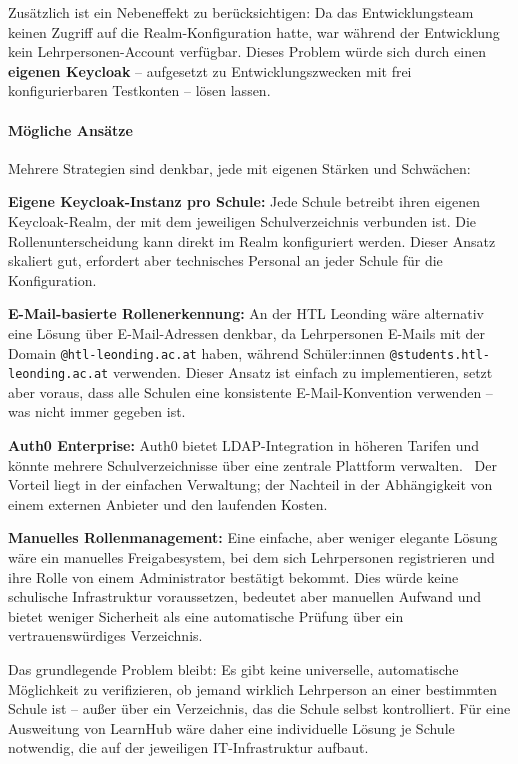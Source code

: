 Zusätzlich ist ein Nebeneffekt zu berücksichtigen: Da das
Entwicklungsteam keinen Zugriff auf die Realm-Konfiguration hatte, war
während der Entwicklung kein Lehrpersonen-Account verfügbar. Dieses
Problem würde sich durch einen \textbf{eigenen Keycloak} -- aufgesetzt
zu Entwicklungszwecken mit frei konfigurierbaren Testkonten -- lösen
lassen.

\paragraph{Mögliche Ansätze}

Mehrere Strategien sind denkbar, jede mit eigenen Stärken und
Schwächen:

\textbf{Eigene Keycloak-Instanz pro Schule:} Jede Schule betreibt
ihren eigenen Keycloak-Realm, der mit dem jeweiligen
Schulverzeichnis verbunden ist. Die Rollenunterscheidung kann direkt
im Realm konfiguriert werden. Dieser Ansatz skaliert gut, erfordert
aber technisches Personal an jeder Schule für die
Konfiguration.~\cite{keycloak-docs}

\textbf{E-Mail-basierte Rollenerkennung:} An der HTL Leonding wäre
alternativ eine Lösung über E-Mail-Adressen denkbar, da Lehrpersonen
E-Mails mit der Domain \texttt{@htl-leonding.ac.at} haben, während
Schüler:innen \texttt{@students.htl-leonding.ac.at} verwenden. Dieser
Ansatz ist einfach zu implementieren, setzt aber voraus, dass alle
Schulen eine konsistente E-Mail-Konvention verwenden -- was nicht
immer gegeben ist.

\textbf{Auth0 Enterprise:} Auth0 bietet LDAP-Integration in höheren
Tarifen und könnte mehrere Schulverzeichnisse über eine zentrale
Plattform verwalten.~\cite{auth0-pricing} Der Vorteil liegt in der
einfachen Verwaltung; der Nachteil in der Abhängigkeit von einem
externen Anbieter und den laufenden Kosten.

\textbf{Manuelles Rollenmanagement:} Eine einfache, aber weniger
elegante Lösung wäre ein manuelles Freigabesystem, bei dem sich
Lehrpersonen registrieren und ihre Rolle von einem Administrator
bestätigt bekommt. Dies würde keine
schulische Infrastruktur voraussetzen, bedeutet aber manuellen
Aufwand und bietet weniger Sicherheit als eine automatische Prüfung
über ein vertrauenswürdiges Verzeichnis.

Das grundlegende Problem bleibt: Es gibt keine universelle, automatische
Möglichkeit zu verifizieren, ob jemand wirklich Lehrperson an einer
bestimmten Schule ist -- außer über ein Verzeichnis, das die Schule
selbst kontrolliert. Für eine Ausweitung von LearnHub wäre daher eine
individuelle Lösung je Schule notwendig, die auf der jeweiligen
IT-Infrastruktur aufbaut.